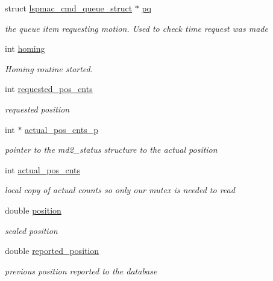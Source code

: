 \begin{DoxyCompactItemize}
struct \hyperlink{structlspmac__cmd__queue__struct}{lspmac\-\_\-cmd\-\_\-queue\-\_\-struct} $\ast$ \hyperlink{structlspmac__motor__struct_ae0a0c9264f49f51bf72168c3b62f8723}{pq}
\begin{DoxyCompactList}\small\item\em the queue item requesting motion. Used to check time request was made \end{DoxyCompactList}\item 
int \hyperlink{structlspmac__motor__struct_aa74108855693f94fc2ff76333c9fb6ac}{homing}
\begin{DoxyCompactList}\small\item\em Homing routine started. \end{DoxyCompactList}\item 
int \hyperlink{structlspmac__motor__struct_a6e8dc9c11dc52a439fe9837230f93ce2}{requested\-\_\-pos\-\_\-cnts}
\begin{DoxyCompactList}\small\item\em requested position \end{DoxyCompactList}\item 
int $\ast$ \hyperlink{structlspmac__motor__struct_a312047bb71def5cd2443fecd875eaea5}{actual\-\_\-pos\-\_\-cnts\-\_\-p}
\begin{DoxyCompactList}\small\item\em pointer to the md2\-\_\-status structure to the actual position \end{DoxyCompactList}\item 
int \hyperlink{structlspmac__motor__struct_ae5c7aea45b9637a1817be246688fd980}{actual\-\_\-pos\-\_\-cnts}
\begin{DoxyCompactList}\small\item\em local copy of actual counts so only our mutex is needed to read \end{DoxyCompactList}\item 
double \hyperlink{structlspmac__motor__struct_af8ffb3aed907d8664b65b37601954411}{position}
\begin{DoxyCompactList}\small\item\em scaled position \end{DoxyCompactList}\item 
double \hyperlink{structlspmac__motor__struct_ae5f1f605a0f587500e627332ad4e5e7e}{reported\-\_\-position}
\begin{DoxyCompactList}\small\item\em previous position reported to the database \end{DoxyCompactList}\item 

\end{DoxyCompactItemize}
